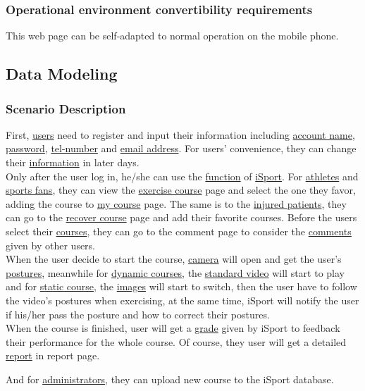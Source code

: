 \documentclass[16pt]{scrreprt}
\begin{document}
\subsubsection{Operational environment convertibility requirements}
This web page can be self-adapted to normal operation on the mobile phone.


\subsection{Data Modeling}
\subsubsection{Scenario Description}
First, \underline{users} need to register and input their information including \underline{account name}, \underline{password}, \underline{tel-number} and \underline{email address}. For users’ convenience, they can change their \underline{information} in later days.\\
\noindent Only after the user log in, he/she can use the \underline{function} of \underline{iSport}. For \underline{athletes} and \underline{sports fans}, they can view the \underline{exercise course} page and select the one they favor, adding the course to \underline{my course} page. The same is to the \underline{injured patients}, they can go to the \underline{recover course} page and add their favorite courses. Before the users select their \underline{courses}, they can go to the comment page to consider the \underline{comments} given by other users. \\
\noindent When the user decide to start the course, \underline{camera} will open and get the user’s \underline{postures}, meanwhile for \underline{dynamic courses}, the \underline{standard video} will start to play and for \underline{static course}, the \underline{images} will start to switch, then the user have to follow the video’s postures when exercising, at the same time, iSport will notify the user if his/her pass the posture and how to correct their postures. \\
\noindent When the course is finished, user will get a \underline{grade} given by iSport to feedback their performance for the whole course. Of course, they user will get a detailed \underline{report} in report page.

\noindent And for \underline{administrators}, they can upload new course to the iSport database.
\end{document}
